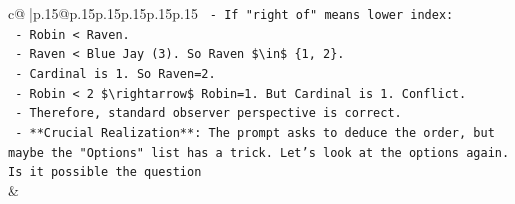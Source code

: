 \documentclass{article}
\begin{document}
{\begin{supertabular}{c@{$\;$}|p{.15\linewidth}@{}p{.15\linewidth}p{.15\linewidth}p{.15\linewidth}p{.15\linewidth}p{.15\linewidth}}
{{{\texttt{   {-} If "right of" means lower index:} \\
\texttt{     {-} Robin < Raven.} \\
\texttt{     {-} Raven < Blue Jay (3). So Raven \$\textbackslash{}in\$ \{1, 2\}.} \\
\texttt{     {-} Cardinal is 1. So Raven=2.} \\
\texttt{     {-} Robin < 2 \$\textbackslash{}rightarrow\$ Robin=1. But Cardinal is 1. Conflict.} \\
\texttt{   {-} Therefore, standard observer perspective is correct.} \\
\texttt{   {-} **Crucial Realization**: The prompt asks to deduce the order, but maybe the "Options" list has a trick. Let's look at the options again. Is it possible the question} \\
            }
        }
    }
    & \\ \\

\end{supertabular}
}
\end{document}
